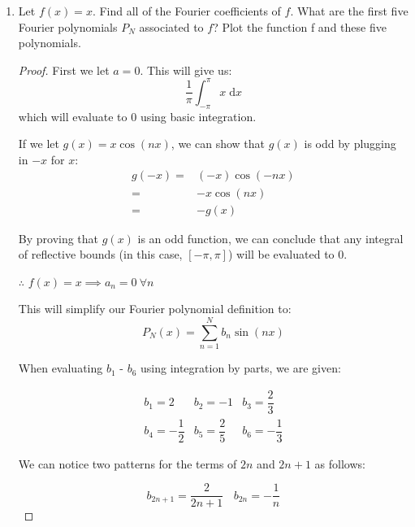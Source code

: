\documentclass[12pt]{article}
\begin{document}
\begin{enumerate}[label=(\alph*)]
    \item Let $f(x) = x$. Find all of the Fourier coefficients of $f$. What are the first five Fourier polynomials $P_N$ associated to $f$? Plot the function f and these five polynomials.
\begin{proof}
    First we let $a = 0$. This will give us:
    \[\frac{1}{\pi}\int_{-\pi}^{\pi}x\; \mathrm{d}x\]
    which will evaluate to $0$ using basic integration. 
    
    \vspace{.1in}
    
    If we let $g(x) =x\cos(nx)$, we can show that $g(x)$ is odd by plugging in $-x$ for $x$:
    \begin{align}
    g(-x) = & (-x)\cos(-nx)
    \\= & -x\cos(nx)
    \\= &-g(x)
    \end{align}

    By proving that $g(x)$ is an odd function, we can conclude that any integral of reflective bounds (in this case, $[-\pi,\pi]$) will be evaluated to $0$.

    \vspace{.1in}

    $\therefore$ \; \; $f(x) = x \implies a_n = 0\ \forall n$

    \vspace{.1in}

    This will simplify our Fourier polynomial definition to:
    \[P_N(x) = \sum_{n=1}^{N}{b_n\sin(nx)}\]

    \vspace{.1in}

    When evaluating $b_1$ - $b_6$ using integration by parts, we are given:

    \[
    \begin{array}{lll}
      b_1 = 2 & b_2 = -1 & b_3 = \dfrac{2}{3} \\
      b_4 = -\dfrac{1}{2} & b_5 = \dfrac{2}{5} & b_6 = -\dfrac{1}{3}
    \end{array}
    \]

    We can notice two patterns for the terms of $2n$ and $2n+1$ as follows:

    \vspace{.1in}

    \[b_{2n+1} = \dfrac{2}{2n+1}\: \:\: \:b_{2n} = -\dfrac{1}{n}\]

    \vspace{.1in}
    

\end{proof}
\end{enumerate}
\end{document}
